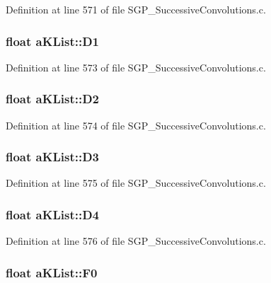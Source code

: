 Definition at line 571 of file SGP\_\-SuccessiveConvolutions.c.\hypertarget{structaKList_c2f18df756daf04e20abd8165ac43ecc}{
\subsubsection[D1]{\setlength{\rightskip}{0pt plus 5cm}float {\bf aKList::D1}}}
\label{d8/d05/structaKList_c2f18df756daf04e20abd8165ac43ecc}




Definition at line 573 of file SGP\_\-SuccessiveConvolutions.c.\hypertarget{structaKList_cc7b2d902c10c27fafc7e4ada411cca5}{
\subsubsection[D2]{\setlength{\rightskip}{0pt plus 5cm}float {\bf aKList::D2}}}
\label{d8/d05/structaKList_cc7b2d902c10c27fafc7e4ada411cca5}




Definition at line 574 of file SGP\_\-SuccessiveConvolutions.c.\hypertarget{structaKList_fa209deff3456d0f63621f8bca5d03e5}{
\subsubsection[D3]{\setlength{\rightskip}{0pt plus 5cm}float {\bf aKList::D3}}}
\label{d8/d05/structaKList_fa209deff3456d0f63621f8bca5d03e5}




Definition at line 575 of file SGP\_\-SuccessiveConvolutions.c.\hypertarget{structaKList_0b867a3be7fb150ff7a4707ff23f5e82}{
\subsubsection[D4]{\setlength{\rightskip}{0pt plus 5cm}float {\bf aKList::D4}}}
\label{d8/d05/structaKList_0b867a3be7fb150ff7a4707ff23f5e82}




Definition at line 576 of file SGP\_\-SuccessiveConvolutions.c.\hypertarget{structaKList_30dcac3a8d0d857f0a42381aa91a15af}{
\subsubsection[F0]{\setlength{\rightskip}{0pt plus 5cm}float {\bf aKList::F0}}}
\label{d8/d05/structaKList_30dcac3a8d0d857f0a42381aa91a15af}




